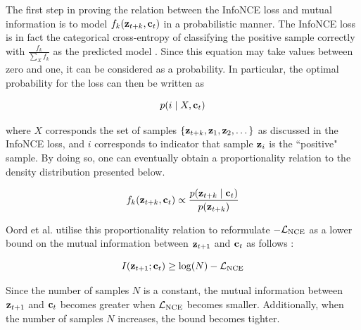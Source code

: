	The first step in proving the relation between the InfoNCE loss and mutual information is to model $f_k(\mathbf{z}_{t+k}, \mathbf{c}_t)$ in a probabilistic manner. The InfoNCE loss is in fact the categorical cross-entropy of classifying the positive sample correctly with $\frac{f_k}{\sum_{X} f_k}$ as the predicted model \cite{oordRepresentationLearningContrastive2019}. Since this equation may take values between zero and one, it can be considered as a probability. In particular, the optimal probability for the loss can then be written as 

	$$p(i \mid X, \mathbf{c}_t)$$
	
	where $X$ corresponds the set of samples  ${ \left\{ \mathbf{z}_{t+k}, \mathbf{z}_1, \mathbf{z}_2, \dots \right\} }$  as discussed in the InfoNCE loss, and $i$ corresponds to indicator that sample $\mathbf{z}_i$ is the ``positive" sample. By doing so, one can eventually obtain a proportionality relation to the density distribution presented below. 
	
	\begin{equation}
		f_k(\mathbf{z}_{t+k}, \mathbf{c}_t) \propto \frac{p(\mathbf{z}_{t+k} \mid \mathbf{c}_t)}{p(\mathbf{z}_{t+k})} \label{eq:fkproporational}
	\end{equation}
	
	Oord et al. utilise this proportionality relation to reformulate $-\mathcal{L}_{\text{NCE}}$ as a lower bound on the mutual information between $\mathbf{z}_{t+1}$ and $\mathbf{c}_t$ as follows \cite{lowePuttingEndEndtoEnd2020, oordRepresentationLearningContrastive2019}:
	
	\begin{equation}
		I(\mathbf{z}_{t+1}; \mathbf{c}_t) \ge \log(N) - \mathcal{L}_{\text{NCE}}
	\end{equation}

	Since the number of samples $N$ is a constant, the mutual information between $\mathbf{z}_{t+1}$ and $\mathbf{c}_t$ becomes greater when $\mathcal{L}_{\text{NCE}}$ becomes smaller. Additionally, when the number of samples $N$ increases, the bound becomes tighter.
	
			
	
	

